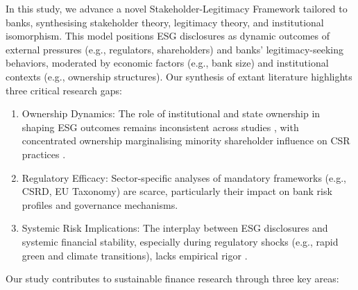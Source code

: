 \documentclass[
  authoryear]{elsarticle}
\begin{document}
In this study, we advance a novel Stakeholder-Legitimacy Framework
\citep{CAMPBELL2007, AGUINIS2012} tailored to banks, synthesising
stakeholder theory, legitimacy theory, and institutional isomorphism.
This model positions ESG disclosures as dynamic outcomes of external
pressures (e.g., regulators, shareholders) and banks' legitimacy-seeking
behaviors, moderated by economic factors (e.g., bank size) and
institutional contexts (e.g., ownership structures). Our synthesis of
extant literature highlights three critical research gaps:

\begin{enumerate}
\def\labelenumi{\arabic{enumi}.}
\item
  Ownership Dynamics: The role of institutional and state ownership in
  shaping ESG outcomes remains inconsistent across studies
  \citep{DYCK2019, RAIMO2020}, with concentrated ownership marginalising
  minority shareholder influence on CSR practices \citep{SMITH2022}.
\item
  Regulatory Efficacy: Sector-specific analyses of mandatory frameworks
  (e.g., CSRD, EU Taxonomy) are scarce, particularly their impact on
  bank risk profiles and governance mechanisms.
\item
  Systemic Risk Implications: The interplay between ESG disclosures and
  systemic financial stability, especially during regulatory shocks
  (e.g., rapid green and climate transitions), lacks empirical rigor
  \citep{ESRB2016}.
\end{enumerate}

Our study contributes to sustainable finance research through three key
areas:
\end{document}
